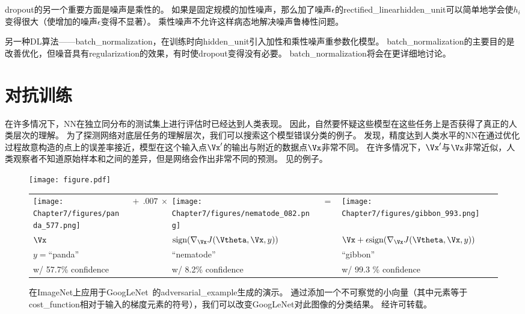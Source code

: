 \gls{dropout}的另一个重要方面是噪声是乘性的。
如果是固定规模的加性噪声，那么加了噪声$\epsilon$的\gls{rectified_linear}\gls{hidden_unit}可以简单地学会使$h_i$变得很大（使增加的噪声$\epsilon$变得不显著）。
乘性噪声不允许这样病态地解决噪声鲁棒性问题。


另一种\gls{DL}算法——\gls{batch_normalization}，在训练时向\gls{hidden_unit}引入加性和乘性噪声重参数化模型。
\gls{batch_normalization}的主要目的是改善优化，但噪音具有\gls{regularization}的效果，有时使\gls{dropout}变得没有必要。
\gls{batch_normalization}将会在更详细地讨论。



\section{对抗训练}
\label{sec:adversarial_training}
在许多情况下，\gls{NN}在独立同分布的测试集上进行评估时已经达到人类表现。
因此，自然要怀疑这些模型在这些任务上是否获得了真正的人类层次的理解。
为了探测网络对底层任务的理解层次，我们可以搜索这个模型错误分类的例子。
\cite{Szegedy-ICLR2014}发现，精度达到人类水平的\gls{NN}在通过优化过程故意构造的点上的误差率接近，模型在这个输入点$\Vx'$的输出与附近的数据点$\Vx$非常不同。
在许多情况下，$\Vx'$与$\Vx$非常近似，人类观察者不知道原始样本和之间的差异，但是网络会作出非常不同的预测。
见的例子。
\begin{figure}[!htb]
\ifOpenSource
\centerline{\texttt{[image: figure.pdf]}}
\else
\centering
\begin{tabular}{>{\centering\arraybackslash}m{.2\figwidth}m{.5in}>{\centering\arraybackslash}m{.2\figwidth}m{.1in}>{\centering\arraybackslash}m{.2\figwidth}}
    \centering\arraybackslash
    \texttt{[image: Chapter7/figures/panda\_577.png]} &%
    \centering\arraybackslash%
$\ +\ .007\ \times$ &%
    \texttt{[image: Chapter7/figures/nematode\_082.png]} &%
    $=$ & %
    \texttt{[image: Chapter7/figures/gibbon\_993.png]} \\
    $\centering \Vx$     &%
    & $\text{sign} (\nabla_{\Vx} J(\Vtheta, \Vx, y) )$ & & $\Vx + \epsilon \text{sign} (\nabla_{\Vx} J(\Vtheta, \Vx, y) )$ \\
    $y=$``panda'' &                & ``nematode''     &   & ``gibbon'' \\
    w/ 57.7\% confidence &        &   w/ 8.2\% confidence & & w/ 99.3 \% confidence
\end{tabular}    
\fi
\caption[Fast adversarial sample generation]{
在ImageNet上应用于GoogLeNet~\citep{Szegedy-et-al-arxiv2014}的\gls{adversarial_example}生成的演示。
通过添加一个不可察觉的小向量（其中元素等于\gls{cost_function}相对于输入的梯度元素的符号），我们可以改变GoogLeNet对此图像的分类结果。
经\citet{Goodfellow-2015-adversarial}许可转载。
}
\label{fig:chap7_panda_577}
\end{figure}

